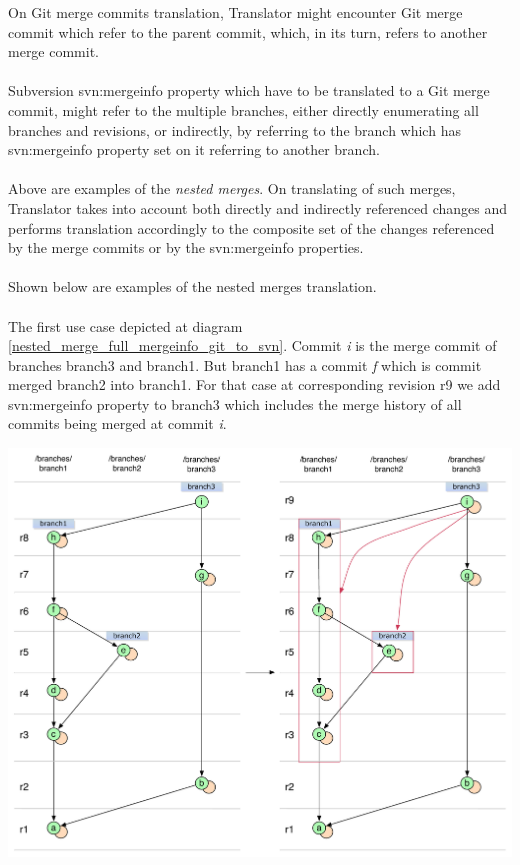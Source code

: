 On Git merge commits translation, Translator might encounter Git merge commit which refer to the parent commit, which,
in its turn, refers to another merge commit.
\\\\
Subversion svn:mergeinfo property which have to be translated to a Git merge commit, might refer to the multiple branches,
either directly enumerating all branches and revisions, or indirectly, by referring to the branch which has svn:mergeinfo property set on it referring to another branch.
\\\\
Above are examples of the \emph{nested merges}. On translating of such merges, Translator takes into account both
directly and indirectly referenced changes and performs translation accordingly to the composite set of the 
changes referenced by the merge commits or by the svn:mergeinfo properties.
\\\\
Shown below are examples of the nested merges translation.
\\\\
The first use case depicted at diagram \ref{nested_merge_full_mergeinfo_git_to_svn}. 
Commit \emph{i} is the merge commit of branches branch3 and branch1. 
But branch1 has a commit \emph{f} which is commit merged branch2 into branch1. 
For that case at corresponding revision r9 we add svn:mergeinfo property to branch3 which includes the merge history of all commits being merged at commit \emph{i}.

\begin{center}
\includegraphics[width=\textwidth]{img/diagrams/nested_merge_full_mergeinfo_git_to_svn.pdf}%
\label{nested_merge_full_mergeinfo_git_to_svn}%
\end{center}

